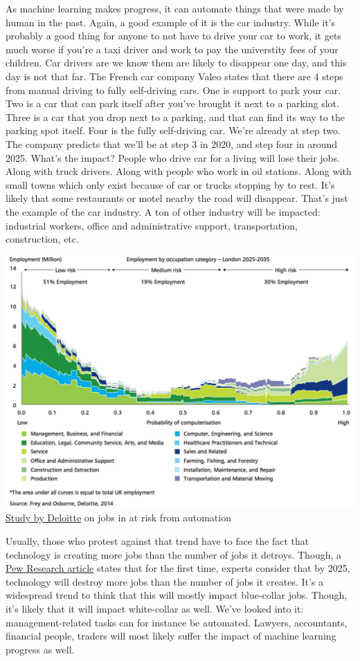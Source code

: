 \documentclass[12pt]{article}
\begin{document}
As machine learning makes progress, it can automate things that were made by human in the past. Again, a good example of it is the car industry. While it's probably a good thing for anyone to not have to drive your car to work, it gets much worse if you're a taxi driver and work to pay the universtity fees of your children. Car drivers are we know them are likely to disappear one day, and this day is not that far.
The French car company Valeo states that there are 4 steps from manual driving to fully self-driving cars. One is support to park your car. Two is a car that can park itself after you've brought it next to a parking slot. Three is a car that you drop next to a parking, and that can find its way to the parking spot itself. Four is the fully self-driving car. We're already at step two. The company predicts that we'll be at step 3 in 2020, and step four in around 2025.
What's the impact? People who drive car for a living will lose their jobs. Along with truck drivers. Along with people who work in oil stations. Along with small towns which only exist because of car or trucks stopping by to rest. It's likely that some restaurants or motel nearby the road will disappear.
That's just the example of the car industry. A ton of other industry will be impacted: industrial workers, office and administrative support, transportation, construction, etc.

\smallskip
\includegraphics[width=\textwidth]{jobs}
\href{http://www2.deloitte.com/content/dam/Deloitte/uk/Documents/uk-futures/london-futures-agiletown.pdf}{Study by Deloitte} on jobs in at risk from automation
\smallskip

Usually, those who protest against that trend have to face the fact that technology is creating more jobs than the number of jobs it detroys. Though, a \href{http://www.pewinternet.org/2014/08/06/future-of-jobs/}{Pew Research article} states that for the first time, experts consider that by 2025, technology will destroy more jobs than the number of jobs it creates. It's a widespread trend to think that this will mostly impact blue-collar jobs. Though, it's likely that it will impact white-collar as well. We've looked into it: management-related tasks can for instance be automated. Lawyers, accountants, financial people, traders will most likely suffer the impact of machine learning progress as well.
\end{document}
